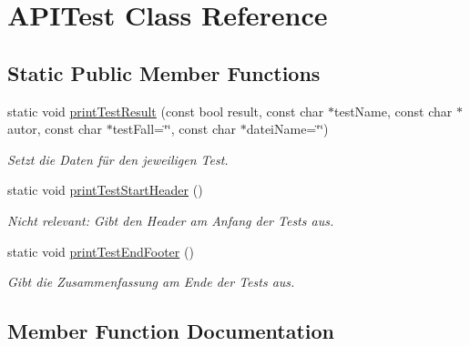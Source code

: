\hypertarget{class_a_p_i_test}{}\section{A\+P\+I\+Test Class Reference}
\label{class_a_p_i_test}
\subsection*{Static Public Member Functions}
\begin{DoxyCompactItemize}
\item 
static void \hyperlink{class_a_p_i_test_a0490000e86b5e6683091ad528fd895c9}{print\+Test\+Result} (const bool result, const char $\ast$test\+Name, const char $\ast$autor, const char $\ast$test\+Fall=\char`\"{}\char`\"{}, const char $\ast$datei\+Name=\char`\"{}\char`\"{})
\begin{DoxyCompactList}\small\item\em Setzt die Daten für den jeweiligen Test. \end{DoxyCompactList}\item 
\mbox{\label{class_a_p_i_test_ac80b26fc4ab1486dbfba4212ddcd40ee}} 
static void \hyperlink{class_a_p_i_test_ac80b26fc4ab1486dbfba4212ddcd40ee}{print\+Test\+Start\+Header} ()
\begin{DoxyCompactList}\small\item\em Nicht relevant\+: Gibt den Header am Anfang der Tests aus. \end{DoxyCompactList}\item 
\mbox{\label{class_a_p_i_test_ad9896663235eefd79e9231e17a66eb04}} 
static void \hyperlink{class_a_p_i_test_ad9896663235eefd79e9231e17a66eb04}{print\+Test\+End\+Footer} ()
\begin{DoxyCompactList}\small\item\em Gibt die Zusammenfassung am Ende der Tests aus. \end{DoxyCompactList}\end{DoxyCompactItemize}


\subsection{Member Function Documentation}
\mbox{\label{class_a_p_i_test_a0490000e86b5e6683091ad528fd895c9}} 
